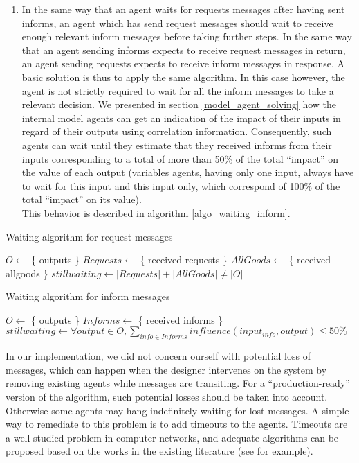 \begin{enumerate}
\item In the same way that an agent waits for requests messages after having sent informs, an agent which has send request messages should wait to receive enough relevant inform messages before taking further steps. In the same way that an agent sending informs expects to receive request messages in return, an agent sending requests expects to receive inform messages in response. A basic solution is thus to apply the same algorithm. In this case however, the agent is not strictly required to wait for all the inform messages to take a relevant decision. We presented in section \ref{model_agent_solving} how the internal model agents can get an indication of the impact of their inputs in regard of their outputs using correlation information. Consequently, such agents can wait until they estimate that they received informs from their inputs corresponding to a total of more than 50\% of the total \enquote{impact} on the value of each output (variables agents, having only one input, always have to wait for this input and this input only, which correspond of 100\% of the total \enquote{impact} on its value).\\
This behavior is described in algorithm \ref{algo_waiting_inform}.
\end{enumerate}

\begin{algorithm}
\caption{Waiting algorithm for request messages}
\label{algo_waiting_requests}

	$O \leftarrow $ \{ outputs \}\;
	$Requests \leftarrow $ \{ received requests \}\;
	$AllGoods \leftarrow $ \{ received allgoods \}\;
	$stillwaiting \leftarrow |Requests| + |AllGoods| \neq |O|$\;

\end{algorithm}

\begin{algorithm}
\caption{Waiting algorithm for inform messages}
\label{algo_waiting_inform}

	$O \leftarrow $ \{ outputs \}\;
	$Informs \leftarrow $ \{ received informs \}\;
	$stillwaiting \leftarrow \forall output \in O, \displaystyle\sum_{info \in Informs}{ influence(input_{info}, output) \leq 50\%}$\;

\end{algorithm}

In our implementation, we did not concern ourself with potential loss of messages, which can happen when the designer intervenes on the system by removing existing agents while messages are transiting. For a \enquote{production-ready} version of the algorithm, such potential losses should be taken into account. Otherwise some agents may hang indefinitely waiting for lost messages. A simple way to remediate to this problem is to add timeouts to the agents. Timeouts are a well-studied problem in computer networks, and adequate algorithms can be proposed based on the works in the existing literature (see \cite{jacobson1988congestion} for example).

